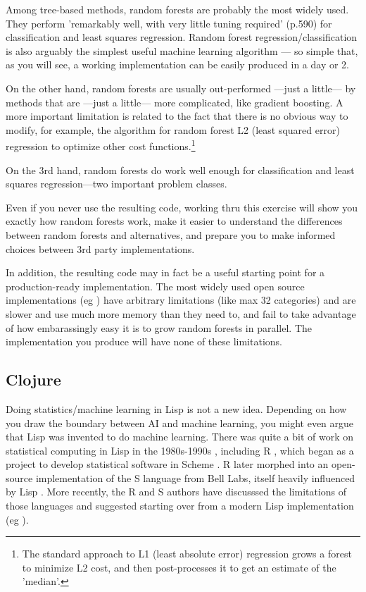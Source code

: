 \documentclass[10pt,openany]{article}
\numberwithin{definition}{section}
\numberwithin{example}{section}
\numberwithin{equation}{section}
\numberwithin{figure}{section}
\begin{document}
Among tree-based methods, random forests are probably the most widely
used. They perform 'remarkably well, with very little tuning required'
(p.590\cite{hastie-tibshirani-friedman-2009}) for classification
and least squares regression. Random forest regression/classification
is also arguably the simplest useful machine learning algorithm ---
so simple that, as you will see, a working implementation can be easily
produced in a day or 2.

On the other hand, random forests are usually out-performed ---just
a little--- by methods that are ---just a little--- more complicated,
like gradient boosting. A more important limitation is related to
the fact that there is no obvious way to modify, for example, the
algorithm for random forest L2 (least squared error) regression to
optimize other cost functions.\footnote{The standard approach to L1 
(least absolute error) regression grows a forest to minimize L2 cost, 
and then post-processes it to get an estimate of the 
'median'.\cite{Meinshausen:2006:QRF:1248547.1248582}}

On the 3rd hand, random forests do work well enough for classification
and least squares regression---two important problem classes. 

Even if you never use the resulting code, working thru this exercise
will show you exactly how random forests work, make it easier to understand
the differences between random forests and alternatives, and prepare
you to make informed choices between 3rd party implementations.

In addition, the resulting code may in fact be a useful starting point
for a production-ready implementation. The most widely used open source
implementations (eg \cite{r-randomForest}) have arbitrary limitations
(like max 32 categories) and are slower and use much more memory than
they need to, and fail to take advantage of how embarassingly easy
it is to grow random forests in parallel. The implementation you produce
will have none of these limitations.


\subsection{Clojure}

Doing statistics/machine learning in Lisp is not a new idea. Depending
on how you draw the boundary between AI and machine learning, you
might even argue that Lisp was invented to do machine learning. There
was quite a bit of work on statistical computing in Lisp in the 1980s-1990s
\cite{donoho1983,mcdonald-pedersen-1988,oldford-peters-dinde-1988,Tierney-1990,Tierney-2005},
including R \cite{r-project}, which began as a project to develop
statistical software in Scheme \cite{ihaka-2010}. R later morphed
into an open-source implementation of the S language from Bell Labs,
itself heavily influenced by Lisp 
\cite{R:Becker+Chambers+Wilks:1988,R:Chambers+Hastie:1992,R:Chambers:1998}.
More recently, the R and S authors have discusssed the limitations
of those languages and suggested starting over from a modern Lisp
implementation (eg \cite{ihaka-lang-2008,Tierney-2005}).
\end{document}
